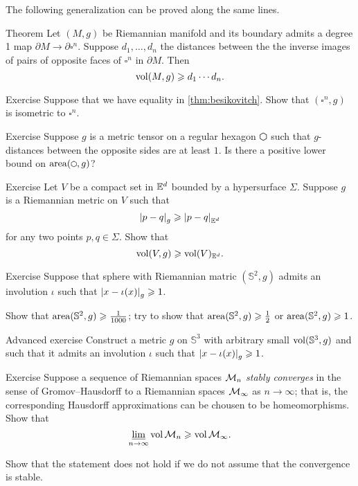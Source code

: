 The following generalization can be proved along the same lines.

\begin{thm}{Theorem}\label{thm:besikovitch+}
Let $(M,g)$ be Riemannian manifold and its boundary admits a degree 1 map $\partial M\to\partial\square^n$. 
Suppose $d_1,\dots, d_n$ the distances between the the inverse images of pairs of opposite faces of $\square^n$ in $\partial M$.
Then 
\[\operatorname{\rm vol}\nolimits(M,g)\geqslant d_1\cdots d_n.\]
\end{thm}

\begin{thm}{Exercise}\label{ex:besikovitch=}
Suppose that we have equality in \ref{thm:besikovitch}.
Show that $(\square^n,g)$ is isometric to $\square^n$.
\end{thm}

\begin{thm}{Exercise}\label{ex:hexagon}
Suppose $g$ is a metric tensor on a regular hexagon $\varhexagon
   $ such that $g$-distances between the opposite sides are at least $1$.
Is there a positive lower bound on $\area(\varhexagon,g)$?
\end{thm}

\begin{thm}{Exercise}\label{ex:gadograph}
Let $V$ be a compact set in $\mathbb{E}^d$ bounded by a hypersurface $\Sigma$.
Suppose $g$ is a Riemannian metric on $V$ such that 
\[\dist{p}{q}{g}\ge\dist{p}{q}{\EE^d}\]
for any two points $p,q\in \Sigma$.
Show that
\[\operatorname{\rm vol}\nolimits(V,g)\geqslant \operatorname{\rm vol}\nolimits(V)_{\mathbb{E}^d}.\]
 
\end{thm}

\begin{thm}{Exercise}\label{ex:involution-of-sphere}
Suppose that sphere with Riemannian matric $(\mathbb{S}^2,g)$ admits an involution $\iota$ such that $\dist{x}{\iota(x)}{g}\ge 1$.

Show that $\operatorname{\rm area}\nolimits(\mathbb{S}^2,g)\geqslant \tfrac1{1000}$;
try to show that $\operatorname{\rm area}\nolimits(\mathbb{S}^2,g)\geqslant \tfrac12$ or $\operatorname{\rm area}\nolimits(\mathbb{S}^2,g)\geqslant 1$.
\end{thm}

\begin{thm}{Advanced exercise}\label{ex:involution-of-3sphere}
Construct a metric $g$ on $\mathbb{S}^3$ with arbitrary small $\operatorname{\rm vol}\nolimits(\mathbb{S}^3,g)$ and such that it admits an involution $\iota$ such that $\dist{x}{\iota(x)}{g}\ge 1$.
\end{thm}

\begin{thm}{Exercise}\label{ex:GH-vol}
Suppose a sequence of Riemannian spaces $\mathcal{M}_n$ \emph{stably converges} in the sense of Gromov--Hausdorff  to a Riemannian spaces $\mathcal{M}_\infty$ as $n\to\infty$;
that is, the corresponding Hausdorff approximations can be chousen to be homeomorphisms.
Show that 
\[\varliminf_{n\to\infty}\operatorname{\rm vol}\nolimits\mathcal{M}_n\geqslant \operatorname{\rm vol}\nolimits\mathcal{M}_\infty.\]

Show that the statement does not hold if we do not assume that the convergence is stable.
\end{thm}

